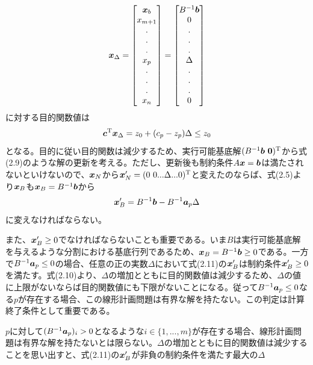 \documentclass[dvipdfmx, 9pt, a4paper]{jsarticle}
\numberwithin{equation}{section}
\newcommand{\bm}[1]{{\mbox{\boldmath $#1$}}}
\begin{document}
\begin{equation}
\bm x_{\Delta}=
\begin{bmatrix}
\bm x_b \\ x_{m+1} \\ . \\ . \\ . \\ x_p \\ . \\ .\\. \\ x_n
\end{bmatrix}
=\begin{bmatrix}
B^{-1}\bm b \\ 0 \\ . \\ . \\ . \\ \Delta \\ . \\ .\\. \\ 0
\end{bmatrix}
\end{equation}
に対する目的関数値は
\begin{equation}
\bm c^{\rm T}\bm x_{\Delta}=z_0+(c_p-z_p)\Delta \leq z_0
\end{equation}
となる。目的に従い目的関数は減少するため、実行可能基底解$(B^{-1}\bm b~\bm 0)^{\rm T}$から式(2.9)のような解の更新を考える。ただし、更新後も制約条件$A\bm x=\bm b$は満たされないといけないので、$\bm x_N$から$\bm x'_N=(0~0...\Delta...0)^{\rm T}$と変えたのならば、式(2.5)より$\bm x_B$も$\bm x_B=B^{-1}\bm b$から
\begin{equation}
\bm x'_B=B^{-1}\bm b-B^{-1}\bm a_p\Delta
\end{equation}
に変えなければならない。\par
また、$\bm x'_B \geq 0$でなければならないことも重要である。いま$B$は実行可能基底解を与えるような分割における基底行列であるため、$\bm x_B=B^{-1}\bm b\geq 0$である。一方で$B^{-1}\bm a_p \leq 0$の場合、任意の正の実数$\Delta$において式(2.11)の$\bm x_B'$は制約条件$\bm x_B' \geq 0$を満たす。式(2.10)より、$\Delta$の増加とともに目的関数値は減少するため、$\Delta$の値に上限がないならば目的関数値にも下限がないことになる。従って$B^{-1}\bm a_p \leq 0$なる$p$が存在する場合、この線形計画問題は有界な解を持たない。この判定は計算終了条件として重要である。\par
$p$に対して$(B^{-1}\bm a_p)_i > 0$となるような$i \in \{1, ..., m\}$が存在する場合、線形計画問題は有界な解を持たないとは限らない。$\Delta$の増加とともに目的関数値は減少することを思い出すと、式(2.11)の$\bm x_B'$が非負の制約条件を満たす最大の$\Delta$
\end{document}
